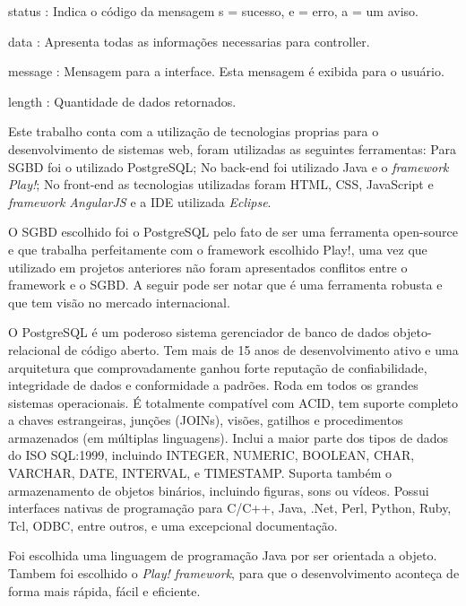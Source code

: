 status : Indica o código da mensagem s = sucesso, e = erro, a = um aviso.\par
data : Apresenta todas as informações necessarias para controller.\par
message : Mensagem para a interface. Esta mensagem é exibida para o usuário.\par
length : Quantidade de dados retornados.\par


Este trabalho conta com a utilização de tecnologias proprias para o desenvolvimento de sistemas web, foram utilizadas as seguintes ferramentas: Para SGBD foi o utilizado PostgreSQL; No back-end foi utilizado Java e o \textit{framework Play!}; No front-end as tecnologias utilizadas foram HTML, CSS, JavaScript e \textit{framework AngularJS} e a IDE utilizada \textit{Eclipse}.\par


O SGBD escolhido foi o PostgreSQL pelo fato de ser uma ferramenta open-source e que trabalha perfeitamente com o framework escolhido Play!, uma vez que utilizado em projetos anteriores não foram apresentados conflitos entre o framework e o SGBD. A seguir pode ser notar que é uma ferramenta robusta e que tem visão no mercado internacional.\par

O PostgreSQL é um poderoso sistema gerenciador de banco de dados objeto-relacional de código aberto.  Tem mais de 15 anos de desenvolvimento ativo e uma arquitetura que comprovadamente ganhou forte reputação de confiabilidade, integridade de dados e conformidade a padrões.  Roda em todos os grandes sistemas operacionais. É totalmente compatível com ACID, tem suporte completo a chaves estrangeiras, junções (JOINs), visões, gatilhos e procedimentos armazenados (em múltiplas linguagens).  Inclui a maior parte dos tipos de dados do ISO SQL:1999, incluindo INTEGER, NUMERIC, BOOLEAN, CHAR, VARCHAR, DATE, INTERVAL, e TIMESTAMP.  Suporta também o armazenamento de objetos binários, incluindo figuras, sons ou vídeos.  Possui interfaces nativas de programação para C/C++, Java, .Net, Perl, Python, Ruby, Tcl, ODBC, entre outros, e uma excepcional documentação.\cite{postgresql}


Foi escolhida uma linguagem de programação Java por ser orientada a objeto. Tambem foi escolhido o \textit{Play! framework}, para que o desenvolvimento aconteça de forma mais rápida, fácil e eficiente.\par

